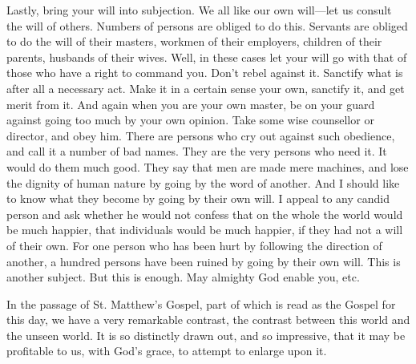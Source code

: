 Lastly, bring your will into subjection. We all
like our own will—let us consult the will of others. Numbers of
persons are obliged to do this. Servants are obliged to do the will of
their masters, workmen of their employers, children of their parents,
husbands of their wives. Well, in these cases let your will go with
that of those who have a right to command you. Don't rebel against it.
Sanctify what is after all a necessary act. Make it in a certain sense
your own, sanctify it, and get merit from it. And again when you are
your own master, be on your guard against going too much by your own
opinion. Take some wise counsellor or director, and obey him. There
are persons who cry out against such obedience, and call it a number
of bad names. They are the very persons who need it. It would do them
much good. They say that men are made mere machines, and lose the
dignity of human nature by going by the word of another. And I should
like to know what they become by going by their own will. I appeal to
any candid person and ask whether he would not confess that on the
whole the world would be much happier, that individuals would be much
happier, if they had not a will of their own. For one person who has
been hurt by following the direction of another, a hundred persons
have been ruined by going by their own will. This is another subject.
But this is enough. May almighty God enable you, etc.



In the passage of St. Matthew's Gospel, part
of which is read as the Gospel for this day, we have a very remarkable
contrast, the contrast between this world and the unseen world. It is
so distinctly drawn out, and so impressive, that it may be profitable
to us, with God's grace, to attempt to enlarge upon it.

